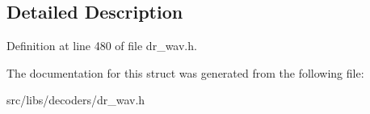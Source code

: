 \subsection{Detailed Description}


Definition at line 480 of file dr\-\_\-wav.\-h.



The documentation for this struct was generated from the following file\-:\begin{DoxyCompactItemize}
\item 
src/libs/decoders/dr\-\_\-wav.\-h\end{DoxyCompactItemize}
